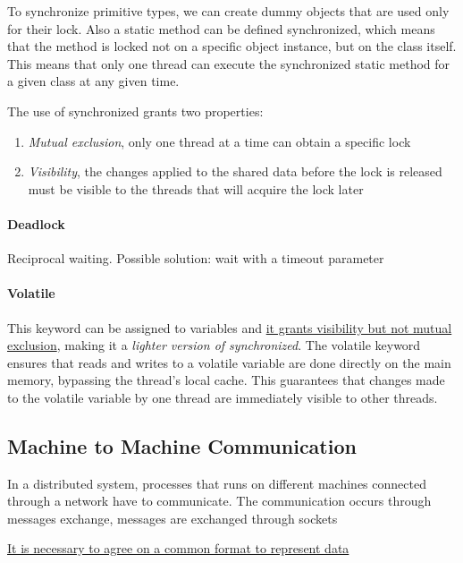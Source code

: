 To synchronize primitive types, we can create dummy objects that are used only for their lock. Also a static method can be defined synchronized, which means that the method is locked not on a specific object instance, but on the class itself. This means that only one thread can execute the synchronized static method for a given class at any given time.

The use of synchronized grants two properties:
\begin{enumerate}
    \item \textit{Mutual exclusion}, only one thread at a time can obtain a specific lock
    \item \textit{Visibility}, the changes applied to the shared data before the lock is released must be visible to the threads that will acquire the lock later
\end{enumerate}

\paragraph{Deadlock}
Reciprocal waiting. Possible solution: wait with a timeout parameter

\paragraph{Volatile}
This keyword can be assigned to variables and \uline{it grants visibility but not mutual exclusion}, making it a \textit{lighter version of synchronized}. The volatile keyword ensures that reads and writes to a volatile variable are done directly on the main memory, bypassing the thread's local cache. This guarantees that changes made to the volatile variable by one thread are immediately visible to other threads.

\subsection{Machine to Machine Communication}
In a distributed system, processes that runs on different machines connected through a network have to communicate. The communication occurs through messages exchange, messages are exchanged through sockets

\uline{It is necessary to agree on a common format to represent data}

